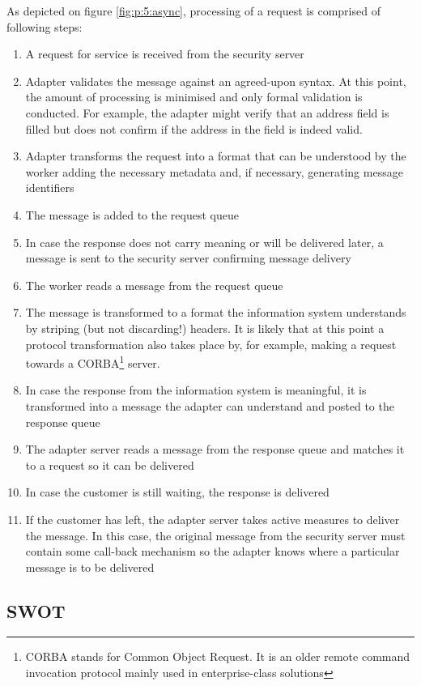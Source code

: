 \documentclass[10pt,a4paper]{article}
\begin{document}
As depicted on figure \ref{fig:p:5:async}, processing of a request is comprised of following steps:

\begin{enumerate}
	\item A request for service is received from the security server
	\item Adapter validates the message against an agreed-upon syntax. At this point, the amount of processing is minimised and only formal validation is conducted. For example, the adapter might verify that an address field is filled but does not confirm if the address in the field is indeed valid.
	\item Adapter transforms the request into a format that can be understood by the worker adding the necessary metadata and, if necessary, generating message identifiers
	\item The message is added to the request queue
	\item In case the response does not carry meaning or will be delivered later, a message is sent to the security server confirming message delivery
	\item The worker reads a message from the request queue 
	\item The message is transformed to a format the information system understands by striping (but not discarding!) headers. It is likely that at this point a protocol transformation also takes place by, for example, making a request towards a CORBA\footnote{CORBA stands for Common Object Request. It is an older remote command invocation protocol mainly used in enterprise-class solutions} server. 
	\item In case the response from the information system is meaningful, it is transformed into a message the adapter can understand and posted to the response queue
	\item The adapter server reads a message from the response queue and matches it to a request so it can be delivered
	\item In case the customer is still waiting, the response is delivered
	\item If the customer has left, the adapter server takes active measures to deliver the message. In this case, the original message from the security server must contain some call-back mechanism so the adapter knows where a particular message is to be delivered 
\end{enumerate}

\subsection{SWOT}
\end{document}
